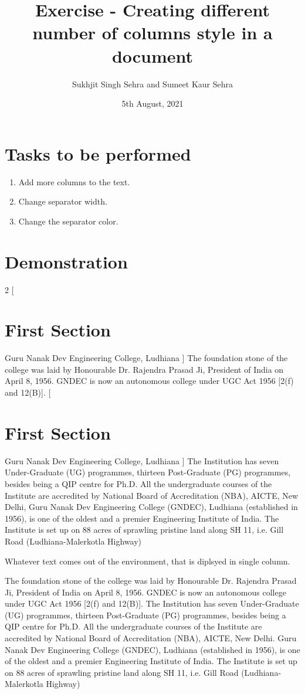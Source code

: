 \documentclass{article}
\title{Exercise  - Creating different number of columns style in a document}
\author{Sukhjit Singh Sehra and Sumeet Kaur Sehra}
\date{5th August, 2021}
\begin{document}
	\maketitle	
	\section*{Tasks to be performed}
	\begin{enumerate}	
		\item Add more columns to the text.
		\item Change separator width.
		\item Change the separator color.
		\end{enumerate}
	\section*{Demonstration}
	\begin{multicols}{2}
		[
		\section{First Section}
		Guru Nanak Dev Engineering College, Ludhiana
		]
				 The foundation stone of the college
				 was laid by Honourable Dr. Rajendra Prasad Ji, President of India on April 8,
				 1956. GNDEC is now an autonomous college under UGC Act 1956 [2(f) and
				 12(B)]. 
				 [
				 \section*{First Section}
				 Guru Nanak Dev Engineering College, Ludhiana
				 ]
				 The Institution has seven Under-Graduate (UG) programmes,
				 thirteen Post-Graduate (PG) programmes, besides being a QIP centre for
				 Ph.D. All the undergraduate courses of the Institute are accredited by
				 National Board of Accreditation (NBA), AICTE, New Delhi, Guru Nanak Dev Engineering College (GNDEC), Ludhiana (established in
				 1956), is one of the oldest and a premier Engineering Institute of India. The
				 Institute is set up on 88 acres of sprawling pristine land along SH 11, i.e. Gill
				 Road (Ludhiana-Malerkotla Highway)
	\end{multicols}
	Whatever text comes out of the environment, that is diplsyed in single column.
	

The foundation stone of the college
was laid by Honourable Dr. Rajendra Prasad Ji, President of India on April 8,
1956. GNDEC is now an autonomous college under UGC Act 1956 [2(f) and
12(B)]. The Institution has seven Under-Graduate (UG) programmes,
thirteen Post-Graduate (PG) programmes, besides being a QIP centre for
Ph.D. All the undergraduate courses of the Institute are accredited by
National Board of Accreditation (NBA), AICTE, New Delhi. 	Guru Nanak Dev Engineering College (GNDEC), Ludhiana (established in
1956), is one of the oldest and a premier Engineering Institute of India. The
Institute is set up on 88 acres of sprawling pristine land along SH 11, i.e. Gill
Road (Ludhiana-Malerkotla Highway)
\end{document}
